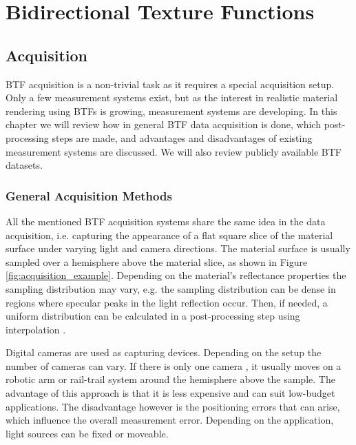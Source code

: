 \chapter{Bidirectional Texture Functions}
\label{chapter:stateOfArt}


\section{Acquisition}
\label{chapter:acquisition}

BTF acquisition is a non-trivial task as it requires a special acquisition setup. 
Only a few measurement systems \cite{star2004,schwartz,dana,Kaleidoscope,Koudelka,statistical_acq} exist, but as the interest in realistic material rendering using BTFs is growing, measurement systems are developing.
In this chapter we will review how in general BTF data acquisition is done, which post-processing steps are made, and advantages and disadvantages of existing measurement systems are discussed. 
We will also review publicly available BTF datasets.

\subsection{General Acquisition Methods}
\label{section:General_acquisition}	
All the mentioned BTF acquisition systems share the same idea in the data acquisition, i.e. capturing the appearance of a flat square slice of the material surface under varying light and camera directions.
The material surface is usually sampled over a hemisphere above the material slice, as shown in Figure \ref{fig:acquisition_example}.
Depending on the material's reflectance properties the sampling distribution may vary, e.g. the sampling distribution can be dense in regions where specular peaks in the light reflection occur. 
Then, if needed, a uniform distribution can be calculated in a post-processing step using interpolation \cite{haindl_visual}.

Digital cameras are used as capturing devices. Depending on the setup the number of cameras can vary.
 If there is only one camera \cite{star2004,statistical_acq,dana}, it usually moves on a robotic arm or rail-trail system around the hemisphere above the sample\cite{star2004}. 
 The advantage of this approach is that it is less expensive and can suit low-budget applications.
The disadvantage however is the positioning errors that can arise, which influence the overall measurement error. 
Depending on the application, light sources can be fixed or moveable.

